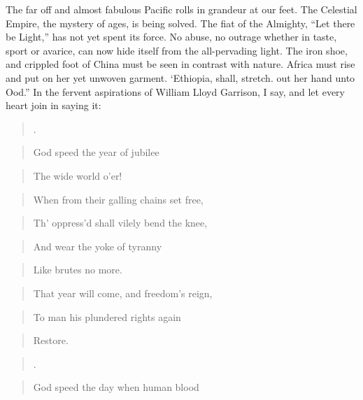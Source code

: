 \documentclass[a4paper]{amsbook}
\begin{document}
The far off and almost fabulous Pacific rolls in grandeur at our feet. The Celestial Empire, the mystery of ages, is being solved. The fiat of the Almighty, “Let there be Light,” has not yet spent its force. No abuse, no outrage whether in taste, sport or avarice, can now hide itself from the all-pervading light. The iron shoe, and crippled foot of China must be seen in contrast with nature. Africa must rise and put on her yet unwoven garment. ‘Ethiopia, shall, stretch. out her hand unto Ood.” In the fervent aspirations of William Lloyd Garrison, I say, and let every heart join in saying it:

\begin{quote}.\end{quote}

\begin{quote}God speed the year of jubilee\end{quote}

\begin{quote}The wide world o'er!\end{quote}

\begin{quote}When from their galling chains set free,\end{quote}

\begin{quote}Th' oppress'd shall vilely bend the knee,\end{quote}

\begin{quote}And wear the yoke of tyranny\end{quote}

\begin{quote}Like brutes no more.\end{quote}

\begin{quote}That year will come, and freedom's reign,\end{quote}

\begin{quote}To man his plundered rights again\end{quote}

\begin{quote}Restore.\end{quote}

\begin{quote}.\end{quote}

\begin{quote}God speed the day when human blood\end{quote}
\end{document}
